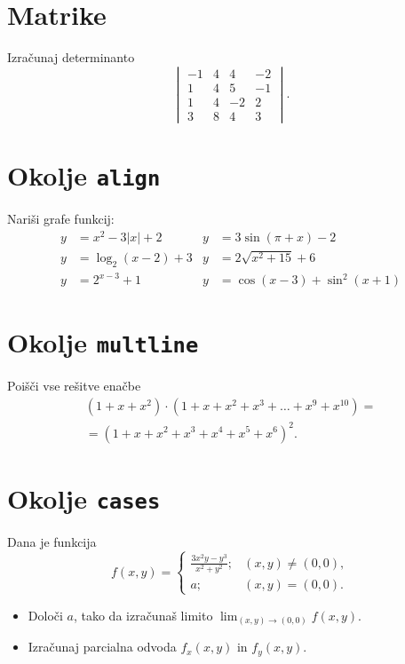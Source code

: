 \documentclass[a4paper,12pt]{article}
\begin{document}
\section*{Matrike}
Izračunaj determinanto
\[
   \begin{vmatrix}
   -1 & 4 & 4 & -2 \\
   1 & 4 & 5 & -1 \\
   1 & 4 & -2 & 2 \\
   3 & 8 & 4 & 3
   \end{vmatrix}.
\]

\section*{Okolje \texttt{align}}
Nariši grafe funkcij:
\begin{align*}
y &= x^2 - 3|x| + 2  & y &= 3 \sin(\pi+x) - 2 \\
y &= \log_2(x-2) + 3 & y &= 2 \sqrt{x^2+15} + 6 \\
y &= 2^{x-3} + 1     & y &= \cos(x-3) + \sin^2(x+1)
\end{align*}

\section*{Okolje \texttt{multline}}
Poišči vse rešitve enačbe
\begin{multline*}
(1+x+x^2) \cdot (1+x+x^2+x^3+\ldots+x^9+x^{10}) = \\
=(1+x+x^2+x^3+x^4+x^5+x^6)^2.
\end{multline*}

\section*{Okolje \texttt{cases}}
Dana je funkcija
\[
   f(x,y) =
   \begin{cases}
      \frac{3x^2y-y^3}{x^2+y^2}; & (x,y) \neq (0,0), \\
      a; & (x,y) = (0,0).
   \end{cases}
\]
\begin{itemize}
\item Določi \(a\), tako da izračunaš limito \( \lim_{(x,y)\to(0,0)} f(x,y) \).
\item Izračunaj parcialna odvoda \(f_x(x,y)\) in \(f_y(x,y)\).
\end{itemize}
\end{document}
